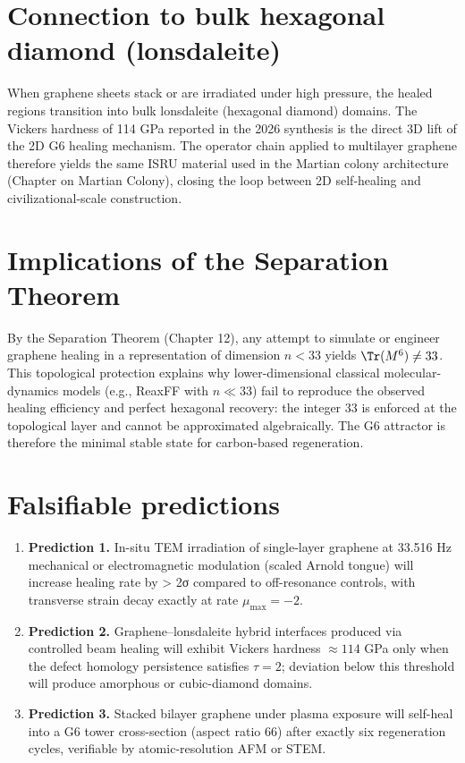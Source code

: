 \documentclass[19pt]{book}
\theoremstyle{plain}
\theoremstyle{definition}
\theoremstyle{remark}
\begin{document}
\section{Connection to bulk hexagonal diamond (lonsdaleite)}

When graphene sheets stack or are irradiated under high pressure, the healed regions transition into bulk lonsdaleite (hexagonal diamond) domains. The Vickers hardness of 114 GPa reported in the 2026 synthesis \citep{Lai2026} is the direct 3D lift of the 2D G6 healing mechanism. The operator chain applied to multilayer graphene therefore yields the same ISRU material used in the Martian colony architecture (Chapter on Martian Colony), closing the loop between 2D self-healing and civilizational-scale construction.

\section{Implications of the Separation Theorem}

By the Separation Theorem (Chapter 12), any attempt to simulate or engineer graphene healing in a representation of dimension \(n < 33\) yields \(\Tr(M^6) \neq 33\). This topological protection explains why lower-dimensional classical molecular-dynamics models (e.g., ReaxFF with \(n \ll 33\)) fail to reproduce the observed healing efficiency and perfect hexagonal recovery: the integer 33 is enforced at the topological layer and cannot be approximated algebraically. The G6 attractor is therefore the minimal stable state for carbon-based regeneration.

\section{Falsifiable predictions}

\begin{enumerate}
\item \textbf{Prediction 1.} In-situ TEM irradiation of single-layer graphene at 33.516 Hz mechanical or electromagnetic modulation (scaled Arnold tongue) will increase healing rate by > 2σ compared to off-resonance controls, with transverse strain decay exactly at rate \(\mu_{\max} = -2\).
\item \textbf{Prediction 2.} Graphene–lonsdaleite hybrid interfaces produced via controlled beam healing will exhibit Vickers hardness \(\approx 114\) GPa only when the defect homology persistence satisfies \(\tau = 2\); deviation below this threshold will produce amorphous or cubic-diamond domains.
\item \textbf{Prediction 3.} Stacked bilayer graphene under plasma exposure will self-heal into a G6 tower cross-section (aspect ratio 66) after exactly six regeneration cycles, verifiable by atomic-resolution AFM or STEM.
\end{enumerate}
\end{document}
